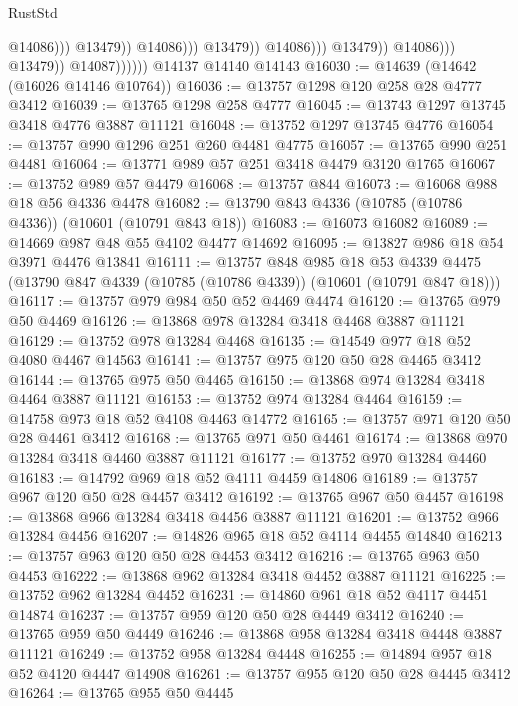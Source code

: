 \begin{lexlean}{RustStd}
\begin{coremodule}
                                                        @14086)))
                                                  @13479))
                                              @14086)))
                                        @13479))
                                    @14086)))
                              @13479))
                          @14086)))
                    @13479))
                @14087))))))
    @14137
    @14140
    @14143
@16030 := @14639 (@14642 (@16026 @14146 @10764))
@16036 := @13757 @1298 @120 @258 @28 @4777 @3412
@16039 := @13765 @1298 @258 @4777
@16045 := @13743 @1297 @13745 @3418 @4776 @3887 @11121
@16048 := @13752 @1297 @13745 @4776
@16054 := @13757 @990 @1296 @251 @260 @4481 @4775
@16057 := @13765 @990 @251 @4481
@16064 := @13771 @989 @57 @251 @3418 @4479 @3120 @1765
@16067 := @13752 @989 @57 @4479
@16068 := @13757 @844
@16073 := @16068 @988 @18 @56 @4336 @4478
@16082 := @13790 @843 @4336 (@10785 (@10786 @4336)) (@10601 (@10791 @843 @18))
@16083 := @16073 @16082
@16089 := @14669 @987 @48 @55 @4102 @4477 @14692
@16095 := @13827 @986 @18 @54 @3971 @4476 @13841
@16111 := @13757
    @848
    @985
    @18
    @53
    @4339
    @4475
    (@13790 @847 @4339 (@10785 (@10786 @4339)) (@10601 (@10791 @847 @18)))
@16117 := @13757 @979 @984 @50 @52 @4469 @4474
@16120 := @13765 @979 @50 @4469
@16126 := @13868 @978 @13284 @3418 @4468 @3887 @11121
@16129 := @13752 @978 @13284 @4468
@16135 := @14549 @977 @18 @52 @4080 @4467 @14563
@16141 := @13757 @975 @120 @50 @28 @4465 @3412
@16144 := @13765 @975 @50 @4465
@16150 := @13868 @974 @13284 @3418 @4464 @3887 @11121
@16153 := @13752 @974 @13284 @4464
@16159 := @14758 @973 @18 @52 @4108 @4463 @14772
@16165 := @13757 @971 @120 @50 @28 @4461 @3412
@16168 := @13765 @971 @50 @4461
@16174 := @13868 @970 @13284 @3418 @4460 @3887 @11121
@16177 := @13752 @970 @13284 @4460
@16183 := @14792 @969 @18 @52 @4111 @4459 @14806
@16189 := @13757 @967 @120 @50 @28 @4457 @3412
@16192 := @13765 @967 @50 @4457
@16198 := @13868 @966 @13284 @3418 @4456 @3887 @11121
@16201 := @13752 @966 @13284 @4456
@16207 := @14826 @965 @18 @52 @4114 @4455 @14840
@16213 := @13757 @963 @120 @50 @28 @4453 @3412
@16216 := @13765 @963 @50 @4453
@16222 := @13868 @962 @13284 @3418 @4452 @3887 @11121
@16225 := @13752 @962 @13284 @4452
@16231 := @14860 @961 @18 @52 @4117 @4451 @14874
@16237 := @13757 @959 @120 @50 @28 @4449 @3412
@16240 := @13765 @959 @50 @4449
@16246 := @13868 @958 @13284 @3418 @4448 @3887 @11121
@16249 := @13752 @958 @13284 @4448
@16255 := @14894 @957 @18 @52 @4120 @4447 @14908
@16261 := @13757 @955 @120 @50 @28 @4445 @3412
@16264 := @13765 @955 @50 @4445

\end{coremodule}
\end{lexlean}
